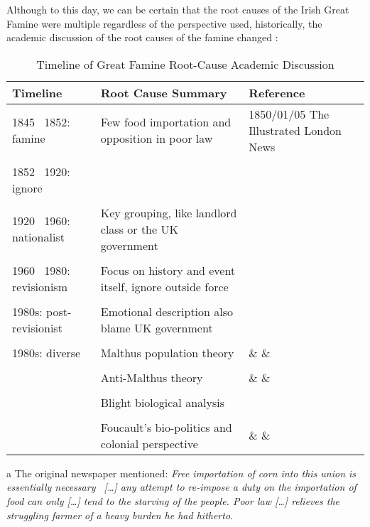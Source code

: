 Although to this day, we can be certain that the root causes of the Irish Great Famine were multiple regardless of the perspective used, 
historically, the academic discussion of the root causes of the famine changed \citep{henderson2005irish}:

\vspace{7pt}
\begin{table}[h]
    \centering
	\begin{threeparttable}
    \caption{Timeline of Great Famine Root-Cause Academic Discussion}
		\begin{tabular}{lp{5cm}p{5cm}}
			\toprule
			Timeline & Root Cause Summary & Reference \\
			\midrule
			1845 \textendash\ 1852: famine & Few food importation and opposition in poor law & 1850/01/05 The Illustrated London News\tnote{a} \\
			& & \\
			1852 \textendash\ 1920: ignore  & \textemdash\ \tnote{b} & \citep{kinealy2017great}\\
			& & \\
			1920 \textendash\ 1960: nationalist & Key grouping, like landlord class or the UK government & \citep{smith2005reckoning} \\
			& & \\
			1960 \textendash\ 1980: revisionism & Focus on history and event itself, ignore outside force & \citep{daly2006revisionism} \\
			& & \\
			1980s: post-revisionist & Emotional description also blame UK government & \citep{hamera2011outline} \\
			& & \\
			1980s: diverse & Malthus population theory & \citep{o2009food} \& \citep{mcgregor1989demographic} \& \citep{weir1991malthus} \\
			& &  \\
			& Anti-Malthus theory & \citep{o1983malthus} \& \citep{mokyr1980malthusian} \& \citep{guinnane1994great}\\
			& & \\
			& Blight biological analysis & \citep{donnelly2011irish}\\
			& & \\
			& Foucault's bio-politics and colonial perspective & \citep{nally2008coming} \& \citep{kennedy2020beckett} \& \citep{madden2016aids} \\
			\bottomrule
		\end{tabular}
		\begin{tablenotes}
			\item[a] The original newspaper mentioned: \textit{Free importation of corn into this union is essentially necessary \textendash\ [\ldots] any attempt to re-impose a duty on the importation of food can only [\ldots]  tend to the starving of the people. Poor law [\ldots] relieves the struggling farmer of a heavy burden he had hitherto.} \citep{1850_01_05_news}
			

\end{tablenotes}
\end{threeparttable}
\end{table}
